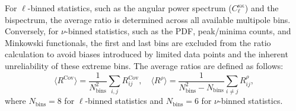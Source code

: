 For $\ell$-binned statistics, such as the angular power spectrum ($C_\ell^{\kappa\kappa}$) and the bispectrum, the average ratio is determined across all available multipole bins. Conversely, for $\nu$-binned statistics, such as the PDF, peak/minima counts, and Minkowski functionals, the first and last bins are excluded from the ratio calculation to avoid biases introduced by limited data points and the inherent unreliability of these extreme bins. The average ratios are defined as follows:
\begin{equation}
    \langle R^{\mathrm{Cov}} \rangle = \frac{1}{N_{\mathrm{bins}}^2} \sum_{i, j} R^{\mathrm{Cov}}_{ij}, \quad \langle R^{\rho} \rangle = \frac{1}{N_{\mathrm{bins}}^2 - N_{\mathrm{bins}}} \sum_{i \neq j} R^{\rho}_{ij},
\end{equation}
where $N_{\mathrm{bins}} = 8$ for $\ell$-binned statistics and $N_{\mathrm{bins}} = 6$ for $\nu$-binned statistics.